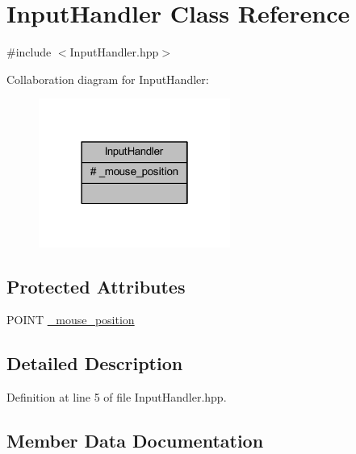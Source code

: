 \hypertarget{class_input_handler}{}\section{Input\+Handler Class Reference}
\label{class_input_handler}


{\ttfamily \#include $<$Input\+Handler.\+hpp$>$}



Collaboration diagram for Input\+Handler\+:\nopagebreak
\begin{figure}[H]
\begin{center}
\leavevmode
\includegraphics[width=178pt]{class_input_handler__coll__graph}
\end{center}
\end{figure}
\subsection*{Protected Attributes}
\begin{DoxyCompactItemize}
\item 
P\+O\+I\+NT \hyperlink{class_input_handler_a858d2c38bb0b24239c6fbc6be3516073_a858d2c38bb0b24239c6fbc6be3516073}{\+\_\+mouse\+\_\+position}
\end{DoxyCompactItemize}


\subsection{Detailed Description}


Definition at line 5 of file Input\+Handler.\+hpp.



\subsection{Member Data Documentation}
